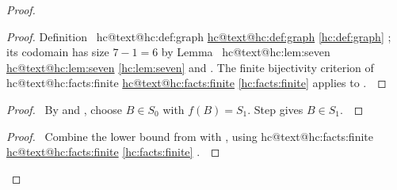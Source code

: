 \documentclass[11pt]{amsart}
\makeatletter
\let\qed\relax
\let\hcSavedRef\ref
\renewcommand{\ref}[1]{%
  \ifcsname hc@text@#1\endcsname
    \hyperlink{\csname hc@target@#1\endcsname}{\csname hc@text@#1\endcsname}%
  \else
    \hcSavedRef{#1}%
  \fi}}
\makeatother
\begin{document}
\begin{proof}
\begin{proof}
  Definition~\ref{hc:def:graph}; its codomain has size $7-1=6$
  by Lemma~\ref{hc:lem:seven} and .
  The finite bijectivity criterion of \ref{hc:facts:finite}
  applies to .~\qed\end{proof}
 \begin{proof}\pf\ By  and ,
  choose $B\in S_0$ with $f(B)=S_1$. Step 
  gives $B\in S_1$.~\qed\end{proof}
 \qedstep
 \begin{proof}\pf\ Combine the lower bound from
   with , using
  \ref{hc:facts:finite}.~\qed\end{proof}
\end{proof}
\end{document}
